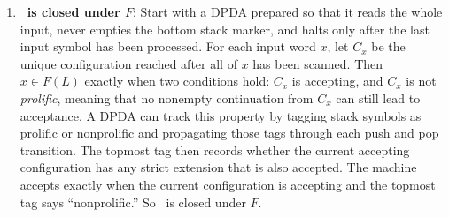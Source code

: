\begin{enumerate}[{10.}1. ]
\begin{enumerate}
\item \textbf{\ASIG\ is closed under $F$}: Start with a DPDA prepared so that it
reads the whole input, never empties the bottom stack marker, and halts only
after the last input symbol has been processed. For each input word $x$, let
$C_x$ be the unique configuration reached after all of $x$ has been scanned.
Then $x\in F(L)$ exactly when two conditions hold: $C_x$ is accepting, and
$C_x$ is not \emph{prolific}, meaning that no nonempty continuation from $C_x$
can still lead to acceptance. A DPDA can track this property by tagging stack
symbols as prolific or nonprolific and propagating those tags through each push
and pop transition. The topmost tag then records whether the current accepting configuration has any
strict extension that is also accepted. The machine accepts exactly when the
current configuration is accepting and the topmost tag says ``nonprolific.'' So
\ASIG\ is closed under $F$.
\end{enumerate}

\end{enumerate}
